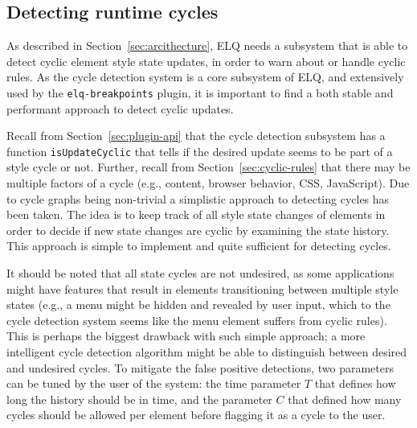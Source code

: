 \documentclass[a4paper,11pt]{kth-mag}
\newcommand{\code}[1]{\texttt{#1}}
\begin{document}
      \subsection{Detecting runtime cycles}\label{sec:imp_cycle_detector}
        As described in Section~\ref{sec:arcithecture}, \gls{ELQ} needs a subsystem that is able to detect cyclic element style state updates, in order to warn about or handle cyclic rules.
        As the cycle detection system is a core subsystem of \gls{ELQ}, and extensively used by the \code{elq-breakpoints} plugin, it is important to find a both stable and performant approach to detect cyclic updates.

        Recall from Section~\ref{sec:plugin-api} that the cycle detection subsystem has a function \code{isUpdateCyclic} that tells if the desired update seems to be part of a style cycle or not.
        Further, recall from Section~\ref{sec:cyclic-rules} that there may be multiple factors of a cycle (e.g., content, \gls{browser} behavior, \gls{CSS}, \gls{JavaScript}).
        Due to cycle graphs being non-trivial a simplistic approach to detecting cycles has been taken.
        The idea is to keep track of all style state changes of \glspl{element} in order to decide if new state changes are cyclic by examining the state history.
        This approach is simple to implement and quite sufficient for detecting cycles.

        It should be noted that all state cycles are not undesired, as some applications might have features that result in \glspl{element} transitioning between multiple style states (e.g., a menu might be hidden and revealed by user input, which to the cycle detection system seems like the menu element suffers from cyclic rules).
        This is perhaps the biggest drawback with such simple approach; a more intelligent cycle detection algorithm might be able to distinguish between desired and undesired cycles.
        To mitigate the false positive detections, two parameters can be tuned by the user of the system: the time parameter $T$ that defines how long the history should be in time, and the parameter $C$ that defined how many cycles should be allowed per element before flagging it as a cycle to the user.
        
\end{document}
